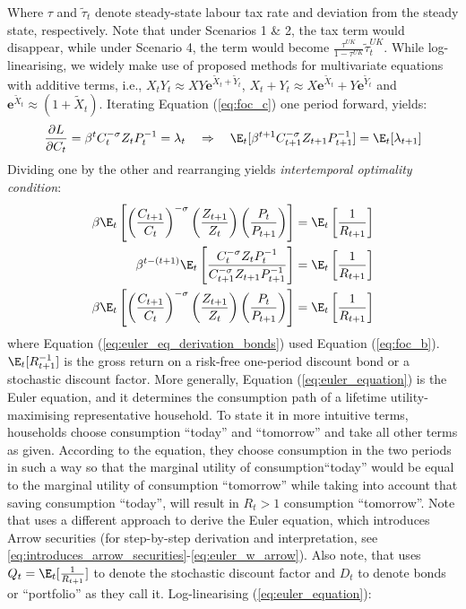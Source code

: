 Where $\tau$ and $\tilde{\tau}_t$ denote steady-state labour tax rate and deviation from the steady state, respectively. Note that under Scenarios 1 \& 2, the tax term would disappear, while under Scenario 4, the term would become $\frac{\tau^{UK}}{1-\tau^{UK}}\tilde{\tau}^{UK}_t$. While log-linearising, we widely make use of \textcite{uhlig_1995_a} proposed methods for multivariate equations with additive terms, i.e., $X_tY_t \approx XY\mathbf{e}^{\tilde{X}_t + \tilde{Y}_t}$, $X_t + Y_t \approx X\mathbf{e}^{\tilde{X}_t} + Y\mathbf{e}^{\tilde{Y}_t}$ and $\mathbf{e}^{\tilde{X}_t} \approx (1 + \tilde{X}_t)$. Iterating Equation (\ref{eq:foc_c}) one period forward, yields:
\begin{align*}
 \frac{\partial L}{\partial C_t} = \beta^t C_t^{-\sigma}Z_t P_{t}^{-1} = \lambda_t \quad \Rightarrow \quad \E_t[\beta^{t+1} C_{t+1}^{-\sigma}Z_{t+1} P_{t+1}^{-1}] = \E_t[\lambda_{t+1}]
\end{align*}
Dividing one by the other and rearranging yields \textit{intertemporal optimality condition}:
\begin{align}
 \beta\E_t\left[\left(\frac{C_{t+1}}{C_{t}}\right)^{-\sigma} \left(\frac{Z_{t+1}}{Z_t}\right) \left(\frac{P_{t}}{ P_{t+1}}\right)\right] &= \E_t \left[\frac{1}{R_{t+1}}\right] \\
 \beta^{t-(t+1)}\E_t\left[\frac{C_t^{-\sigma}Z_t P_{t}^{-1}}{C_{t+1}^{-\sigma}Z_{t+1} P_{t+1}^{-1}}\right] & = \E_t\left[\frac{1}{R_{t+1}}\right] \label{eq:euler_eq_derivation_bonds}\\
 \beta\E_t\left[\left(\frac{C_{t+1}}{C_{t}}\right)^{-\sigma} \left(\frac{Z_{t+1}}{Z_t}\right) \left(\frac{P_{t}}{ P_{t+1}}\right)\right] &= \E_t \left[\frac{1}{R_{t+1}}\right] \label{eq:euler_equation}
\end{align}
where Equation (\ref{eq:euler_eq_derivation_bonds}) used Equation (\ref{eq:foc_b}). $\E_t [ R^{-1}_{t+1}]$ is the gross return on a risk-free one-period discount bond or a stochastic discount factor. More generally, Equation (\ref{eq:euler_equation}) is the Euler equation, and it determines the consumption path of a lifetime utility-maximising representative household. To state it in more intuitive terms, households choose consumption ``today'' and ``tomorrow'' and take all other terms as given. According to the equation, they choose consumption in the two periods in such a way so that the marginal utility of consumption``today'' would be equal to the marginal utility of consumption ``tomorrow'' while taking into account that saving consumption ``today'', will result in $R_t > 1$ consumption ``tomorrow''. Note that \textcite{jordigal_2015_monetary} uses a different approach to derive the Euler equation, which introduces Arrow securities (for step-by-step derivation and interpretation, see \ref{eq:introduces_arrow_securities}-\ref{eq:euler_w_arrow}). Also note, that \citereset\textcite{jordigal_2015_monetary} uses $Q_t = \E_t [ \frac{1}{R_{t+1}}]$ to denote the stochastic discount factor and $D_t$ to denote bonds or ``portfolio'' as they call it. Log-linearising (\ref{eq:euler_equation}):
